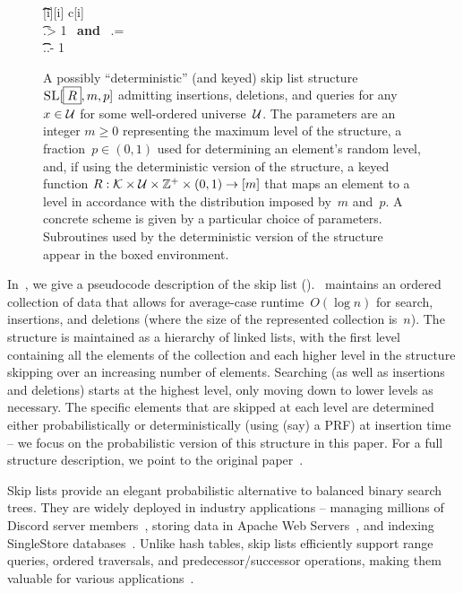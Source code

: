 \begin{figure*}[thp]
\begin{pchstack}[boxed,center,space=0.5em]
\begin{pcvstack}[space=0.45em]
{                            \t\t {}[i][i] \gets c[i] \\
                            \t \pcwhile \llst.\lvl > 1 \ \textbf{and} \ \llst. = \nlll \pcdo\\
                           \t \t \llst.\lvl \gets \llst.\lvl - 1\\
                            \pcreturn \llst
                        }
                \end{pcvstack}	
            \end{pchstack}
      \caption[Skip List Structure.]{A possibly ``deterministic'' (and keyed) skip list structure $\textnormal{\textsc{SL}}[\boxed{R},m,p]$ admitting insertions, deletions, and queries for any~$x \in \mathcal{U}$ for some well-ordered universe~$\mathcal{U}$. The parameters are an integer $m \geq 0$ representing the maximum level of the structure, a fraction~$p \in (0,1)$ used for determining an element's random level, and, if using the deterministic version of the structure, a keyed function $R: \mathcal{K} \times \mathcal{U} \times \mathbb{Z}^{+} \times (0,1) \to [m]$ that maps an element to a level in accordance with the distribution imposed by~$m$ and~$p$. A concrete scheme is given by a particular choice of parameters. Subroutines used by the deterministic version of the structure appear in the boxed environment. 
      } 
      \label{fig:sl}
    \end{figure*}

In~, we give a pseudocode description of the skip list (\SL). \SL \ maintains an ordered collection of data that allows for average-case runtime~$O(\log n)$ for search, insertions, and deletions (where the size of the represented collection is~$n$). The structure is maintained as a hierarchy of linked lists, with the first level containing all the elements of the collection and each higher level in the structure skipping over an increasing number of elements. Searching (as well as insertions and deletions) starts at the highest level, only moving down to lower levels as necessary. The specific elements that are skipped at each level are determined either probabilistically or deterministically (using (say) a PRF) at insertion time -- we focus on the probabilistic version of this structure in this paper. For a full structure description, we point to the original paper~\cite{pugh}. 

Skip lists provide an elegant probabilistic alternative to balanced binary search trees. They are widely deployed in industry applications -- managing millions of Discord server members~\cite{discord}, storing data in Apache Web Servers~\cite{apache}, and indexing SingleStore databases~\cite{singlestore}. Unlike hash tables, skip lists efficiently support range queries, ordered traversals, and predecessor/successor operations, making them valuable for various applications~\cite{quantumwalk, skabnet, InPlaceKV}.

